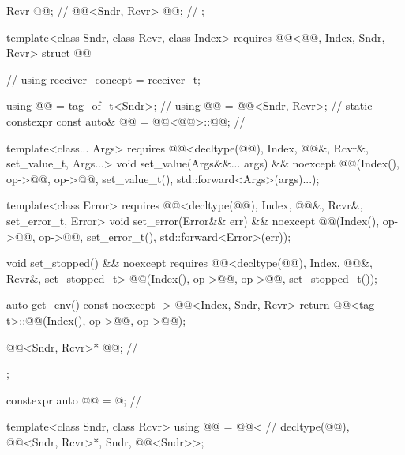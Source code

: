 \begin{codeblock}
{{    Rcvr @@;                                                  // \expos
    @@<Sndr, Rcvr> @@;                               // \expos
  };

  template<class Sndr, class Rcvr, class Index>
    requires @@<@@, Index, Sndr, Rcvr>
  struct @@ {                                       // \expos
    using receiver_concept = receiver_t;

    using @@ = tag_of_t<Sndr>;                               // \expos
    using @@ = @@<Sndr, Rcvr>;                     // \expos
    static constexpr const auto& @@ = @@<@@>::@@;   // \expos

    template<class... Args>
      requires @@<decltype(@@), Index, @@&, Rcvr&, set_value_t, Args...>
    void set_value(Args&&... args) && noexcept {
      @@(Index(), op->@@, op->@@, set_value_t(), std::forward<Args>(args)...);
    }

    template<class Error>
      requires @@<decltype(@@), Index, @@&, Rcvr&, set_error_t, Error>
    void set_error(Error&& err) && noexcept {
      @@(Index(), op->@@, op->@@, set_error_t(), std::forward<Error>(err));
    }

    void set_stopped() && noexcept
      requires @@<decltype(@@), Index, @@&, Rcvr&, set_stopped_t> {
      @@(Index(), op->@@, op->@@, set_stopped_t());
    }

    auto get_env() const noexcept -> @@<Index, Sndr, Rcvr> {
      return @@<tag-t>::@@(Index(), op->@@, op->@@);
    }

    @@<Sndr, Rcvr>* @@;                           // \expos
  };

  constexpr auto @@ = @\seebelow@;                         // \expos

  template<class Sndr, class Rcvr>
  using @@ = @@<                     // \expos
    decltype(@@), @@<Sndr, Rcvr>*, Sndr, @@<Sndr>>;

}
\end{codeblock}
